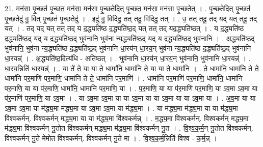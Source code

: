 \documentclass[17pt]{extarticle}
\begin{document}
21. मन॑सा पृ॒च्छत॑ पृ॒च्छत॒ मन॑सा॒ मन॑सा पृ॒च्छतेदित् पृ॒च्छत॒ मन॑सा॒ मन॑सा पृ॒च्छतेत् । . पृ॒च्छतेदित् पृ॒च्छत॑ पृ॒च्छतेदु॑ वु॒ वित् पृ॒च्छत॑ पृ॒च्छतेदु॑ । . इदु॑ वु॒ विदिदु॒ तत् तदु॒ विदिदु॒ तत् । . उ॒ तत् तदू॒ तद् यद् यत् तदू॒ तद् यत् । . तद् यद् यत् तत् तद् य द॒द्ध्यति॑ष्ठ द॒द्ध्यति॑ष्ठ॒द् यत् तत् तद् यद॒द्ध्यति॑ष्ठत् । . य द॒द्ध्यति॑ष्ठ द॒द्ध्यति॑ष्ठ॒द् यद् य द॒द्ध्यति॑ष्ठ॒द् भुव॑नानि॒ भुव॑ना न्य॒द्ध्यति॑ष्ठ॒द् यद् य द॒द्ध्यति॑ष्ठ॒द् भुव॑नानि । . अ॒द्ध्यति॑ष्ठ॒द् भुव॑नानि॒ भुव॑ना न्य॒द्ध्यति॑ष्ठ द॒द्ध्यति॑ष्ठ॒द् भुव॑नानि धा॒रय॑न् धा॒रय॒न् भुव॑ना न्य॒द्ध्यति॑ष्ठ द॒द्ध्यति॑ष्ठ॒द् भुव॑नानि धा॒रयन्न्॑ । . अ॒द्ध्यति॑ष्ठ॒दित्य॑धि - अति॑ष्ठत् । . भुव॑नानि धा॒रय॑न् धा॒रय॒न् भुव॑नानि॒ भुव॑नानि धा॒रयन्न्॑ । . धा॒रय॒न्निति॑ धा॒रयन्न्॑ । . या ते॑ ते॒ या या ते॒ धामा॑नि॒ धामा॑नि ते॒ या या ते॒ धामा॑नि । . ते॒ धामा॑नि॒ धामा॑नि ते ते॒ धामा॑नि पर॒माणि॑ पर॒माणि॒ धामा॑नि ते ते॒ धामा॑नि पर॒माणि॑ । . धामा॑नि पर॒माणि॑ पर॒माणि॒ धामा॑नि॒ धामा॑नि पर॒माणि॒ या या प॑र॒माणि॒ धामा॑नि॒ धामा॑नि पर॒माणि॒ या । . प॒र॒माणि॒ या या प॑र॒माणि॑ पर॒माणि॒ या ऽव॒मा ऽव॒मा या प॑र॒माणि॑ पर॒माणि॒ या ऽव॒मा । . या ऽव॒मा ऽव॒मा या या ऽव॒मा या या ऽव॒मा या या ऽव॒मा या । . अ॒व॒मा या या ऽव॒मा ऽव॒मा या म॑द्ध्य॒मा म॑द्ध्य॒मा या ऽव॒मा ऽव॒मा या म॑द्ध्य॒मा । . या म॑द्ध्य॒मा म॑द्ध्य॒मा या या म॑द्ध्य॒मा वि॑श्वकर्मन्. विश्वकर्मन् मद्ध्य॒मा या या म॑द्ध्य॒मा वि॑श्वकर्मन्न् । . म॒द्ध्य॒मा वि॑श्वकर्मन्. विश्वकर्मन् मद्ध्य॒मा म॑द्ध्य॒मा वि॑श्वकर्मन् नु॒तोत वि॑श्वकर्मन् मद्ध्य॒मा म॑द्ध्य॒मा वि॑श्वकर्मन् नु॒त । . वि॒श्व॒क॒र्म॒न् नु॒तोत वि॑श्वकर्मन्. विश्वकर्मन् नु॒ते मेमोत वि॑श्वकर्मन्. विश्वकर्मन् नु॒ते मा । . वि॒श्व॒क॒र्म॒न्निति॑ विश्व - क॒र्म॒न्न् । \newline
\end{document}

